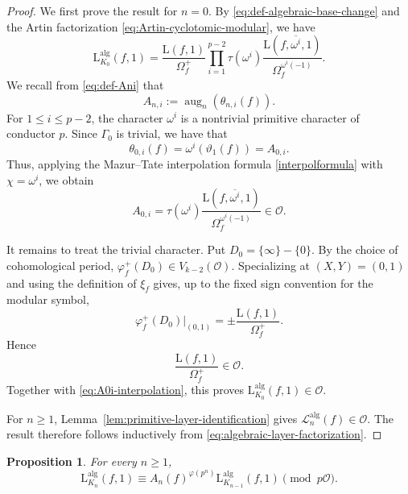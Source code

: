 \documentclass[11pt,table]{amsart}
\newtheorem{proposition}[theorem]{Proposition}
\numberwithin{equation}{section}
\begin{document}
\begin{proof}
We first prove the result for $n=0$. By \eqref{eq:def-algebraic-base-change} and the Artin factorization
\eqref{eq:Artin-cyclotomic-modular}, we have
\[
        \mathrm{L}_{K_0}^{\operatorname{alg}}(f,1)
        =
        \frac{\mathrm{L}(f,1)}{\Omega_f^+}
        \prod_{i=1}^{p-2}
        \tau(\omega^i)
        \frac{\mathrm{L}(f,\overline{\omega^i},1)}
             {\Omega_f^{\omega^i(-1)}}.
\]
We recall from \eqref{eq:def-Ani} that \[A_{n,i}
        :=
        \operatorname{aug}_n(\theta_{n,i}(f)).\] For \(1\leq i\leq p-2\), the
character \(\omega^i\) is a nontrivial primitive character of conductor
\(p\). Since \(\Gamma_0\) is trivial, we have that
\[
        \theta_{0,i}(f)
        =
        \omega^i(\vartheta_1(f))
        =
        A_{0,i}.
\]
Thus, applying the Mazur--Tate interpolation formula
\eqref{interpolformula} with \(\chi=\omega^i\), we obtain
\begin{equation}
\label{eq:A0i-interpolation}
        A_{0,i}
        =
        \tau(\omega^i)
        \frac{\mathrm{L}(f,\overline{\omega^i},1)}
             {\Omega_f^{\omega^i(-1)}}
        \in\mathcal O.
\end{equation}

It remains to treat the trivial character. Put
\(D_0=\{\infty\}-\{0\}\). By the choice of cohomological period,
\(\varphi_f^+(D_0)\in V_{k-2}(\mathcal O)\). Specializing at
\((X,Y)=(0,1)\) and using the definition of \(\xi_f\) gives, up to the
fixed sign convention for the modular symbol,
\[
        \varphi_f^+(D_0)\big|_{(0,1)}
        =
        \pm\frac{\mathrm{L}(f,1)}{\Omega_f^+}.
\]
Hence
\begin{equation}
\label{eq:trivial-algebraic-integrality}
        \frac{\mathrm{L}(f,1)}{\Omega_f^+}
        \in\mathcal O.
\end{equation}
Together with \eqref{eq:A0i-interpolation}, this proves
\(\mathrm{L}_{K_0}^{\operatorname{alg}}(f,1)\in\mathcal O\).

For \(n\geq1\), Lemma~\ref{lem:primitive-layer-identification} gives
\(\mathscr L_n^{\operatorname{alg}}(f)\in\mathcal O\). The result
therefore follows inductively from
\eqref{eq:algebraic-layer-factorization}.
\end{proof}

\begin{proposition}
\label{prop:general-algebraic-L-congruence}
For every \(n\geq1\),
\begin{equation}
\label{eq:general-algebraic-L-congruence}
        \mathrm{L}_{K_n}^{\operatorname{alg}}(f,1)
        \equiv
        A_n(f)^{\varphi(p^n)}
        \mathrm{L}_{K_{n-1}}^{\operatorname{alg}}(f,1)
        \pmod{p\mathcal O}.
\end{equation}
\end{proposition}
\end{document}
